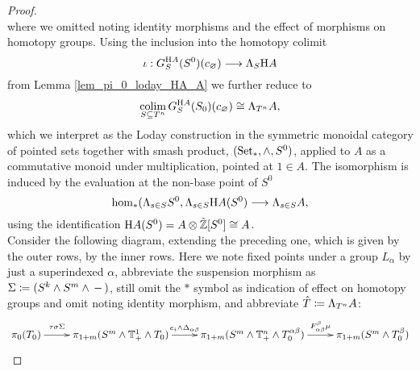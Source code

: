 \begin{prop}
\begin{proof}
\begin{equation*}
{        }
      \end{equation*}
      where we omitted noting identity morphisms and the effect of morphisms on
      homotopy groups. Using the inclusion into the homotopy colimit
      \begin{displaymath}
        \iota: G_S^{\mathrm{H} A}(S^0)(c_\varnothing) \longrightarrow \Lambda_S \mathrm{H} A	
      \end{displaymath}
      from Lemma \ref{lem_pi_0_loday_HA_A} we further reduce to
      \begin{displaymath}
        \colim_{S \subset T^n} G_S^{\H A} (S_0) (c_\varnothing) %
          \cong \Lambda_{T^n} A,
      \end{displaymath}
      which we interpret as the Loday construction in the symmetric monoidal
      category of pointed sets together with smash product, $(\mathrm{Set}_*, \wedge,
      S^0)$, applied to $A$ as a commutative monoid under multiplication,
      pointed at $1 \in A$. %
      The isomorphism is induced by the evaluation at the non-base point of
      $S^0$
      \begin{equation*}
        \hom_*(\Lambda_{s\in S} S^0, \Lambda_{s \in S} \H A(S^0) \to%
          \Lambda_{s \in S} A,
      \end{equation*}
      using the identification $\mathrm{H} A(S^0) = A \otimes \tilde{\mathbb{Z}}[S^0] \cong
      A$.\\
      Consider the following diagram, extending the preceding one, which is
      given by the outer rows, by the inner rows. Here we note fixed points
      under a group $L_\alpha$ by just a superindexed $\alpha$, abbreviate the
      suspension morphism as $\Sigma \coloneqq ( S^k \wedge S^m \wedge {\,-\,} )$,
      still omit the $\ast$ symbol as indication of effect on homotopy groups
      and omit noting identity morphism, and abbreviate $\hat{T} \coloneqq
      \Lambda_{T^n} A$:
      \begin{equation*}
        \xymatrix@R+0.5em{
          \pi_0 (T_0)%
            \ar[r]^-*!/u 3pt/\txt{$\labelstyle\tau\sigma\Sigma$}%
          &
          \pi_{1+m} (S^m \wedge \sT^1_+ \wedge T_0)%
            \ar[r]^-{e_i \wedge \Delta_{\alpha\beta}}%
          &
          \pi_{1+m} (S^m \wedge \sT^n_+ \wedge T_0^{\alpha\beta})
            \ar[r]^-{F_{\alpha\beta}^\beta \mu}%
          &
          \pi_{1+m} (S^m \wedge T_0^\beta)
}
\end{equation*}
\end{proof}
\end{prop}
